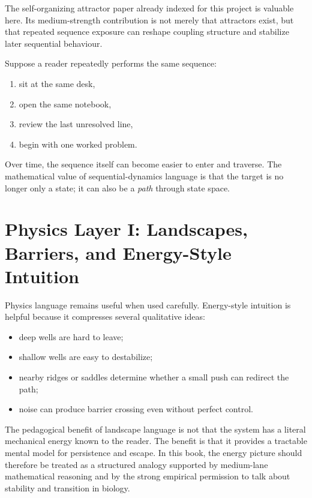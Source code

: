 The self-organizing attractor paper already indexed for this project is
valuable here. Its medium-strength contribution is not merely that attractors
exist, but that repeated sequence exposure can reshape coupling structure and
stabilize later sequential behaviour.

\begin{example}
Suppose a reader repeatedly performs the same sequence:
\begin{enumerate}[nosep]
  \item sit at the same desk,
  \item open the same notebook,
  \item review the last unresolved line,
  \item begin with one worked problem.
\end{enumerate}
Over time, the sequence itself can become easier to enter and traverse. The
mathematical value of sequential-dynamics language is that the target is no
longer only a state; it can also be a \emph{path} through state space.
\end{example}

\section{Physics Layer I: Landscapes, Barriers, and Energy-Style Intuition}

Physics language remains useful when used carefully. Energy-style intuition is
helpful because it compresses several qualitative ideas:
\begin{itemize}[nosep]
  \item deep wells are hard to leave;
  \item shallow wells are easy to destabilize;
  \item nearby ridges or saddles determine whether a small push can redirect
        the path;
  \item noise can produce barrier crossing even without perfect control.
\end{itemize}

\begin{discussion}
The pedagogical benefit of landscape language is not that the system has a
literal mechanical energy known to the reader. The benefit is that it provides
a tractable mental model for persistence and escape. In this book, the energy
picture should therefore be treated as a structured analogy supported by
medium-lane mathematical reasoning and by the strong empirical permission to
talk about stability and transition in biology.
\end{discussion}

